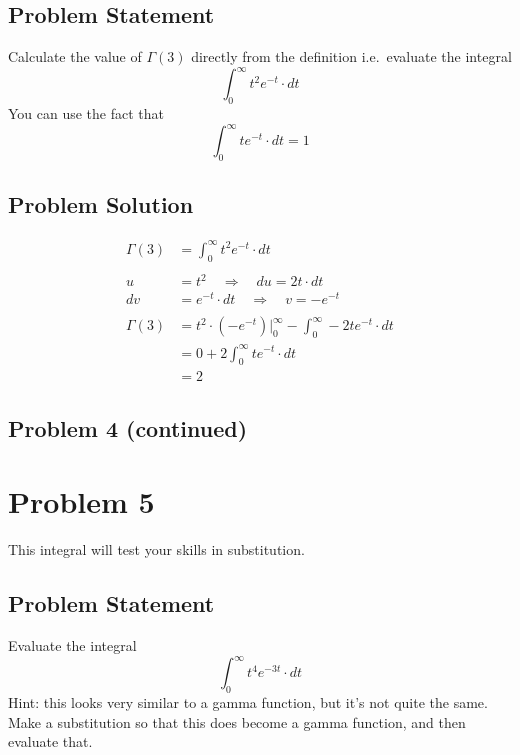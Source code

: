 \documentclass[12pt]{article}
\theoremstyle{definition}
\begin{document}
\subsection*{Problem Statement}

Calculate the value of $\Gamma(3)$ directly from the definition i.e.\ evaluate the integral
$$
\int_0^\infty t^2 e^{-t} \cdot dt
$$
You can use the fact that
$$
\int_0^\infty t e^{-t} \cdot dt = 1
$$

\subsection*{Problem Solution}
\begin{align*}
\Gamma(3) &= \int_0^\infty t^2 e^{-t} \cdot dt\\\\
u &= t^2 \quad\Rightarrow\quad du = 2t \cdot dt\\
dv &= e^{-t} \cdot dt \quad\Rightarrow\quad v = -e^{-t}\\\\
\Gamma(3) &=  t^{2} \cdot (-e^{-t})\biggr\rvert_0^{\infty} - \int_0^\infty -2te^{-t} \cdot dt\\
&= 0 + 2\int_0^\infty te^{-t} \cdot dt\\
&= 2
\end{align*}

\newpage
\subsection*{Problem 4 (continued)}


\newpage
\section*{Problem 5}

This integral will test your skills in substitution.

\subsection*{Problem Statement}

Evaluate the integral
$$
\int_0^\infty t^4 e^{-3t} \cdot dt
$$
Hint: this looks very similar to a gamma function, but it's not quite the same. Make a substitution so that this does become a gamma function, and then evaluate that.
\end{document}
